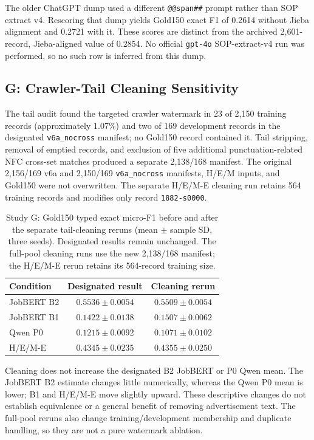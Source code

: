 The older ChatGPT dump used a different \texttt{@@span\#\#} prompt rather than SOP extract v4. Rescoring that dump yields Gold150 exact F1 of 0.2614 without Jieba alignment and 0.2721 with it. These scores are distinct from the archived 2,601-record, Jieba-aligned value of 0.2854. No official \texttt{gpt-4o} SOP-extract-v4 run was performed, so no such row is inferred from this dump.

\FloatBarrier
\subsection{G: Crawler-Tail Cleaning Sensitivity}
\label{sec:peel-sensitivity}

The tail audit found the targeted crawler watermark in 23 of 2,150 training records (approximately 1.07\%) and two of 169 development records in the designated \texttt{v6a\_nocross} manifest; no Gold150 record contained it. Tail stripping, removal of emptied records, and exclusion of five additional punctuation-related NFC cross-set matches produced a separate 2,138/168 manifest. The original 2,156/169 v6a and 2,150/169 \texttt{v6a\_nocross} manifests, H/E/M inputs, and Gold150 were not overwritten. The separate H/E/M-E cleaning run retains 564 training records and modifies only record \texttt{1882-s0000}.

\begin{table}[htbp]
\caption{Study G: Gold150 typed exact micro-F1 before and after the separate tail-cleaning reruns (mean $\pm$ sample SD, three seeds). Designated results remain unchanged. The full-pool cleaning runs use the new 2,138/168 manifest; the H/E/M-E rerun retains its 564-record training size.}
\label{tab:appendix-g-peel}
\centering
\small
\begin{tabularx}{\linewidth}{@{}Lcc@{}}
\toprule
Condition & Designated result & Cleaning rerun \\
\midrule
JobBERT B2 & $0.5536\pm0.0054$ & $0.5509\pm0.0054$ \\
JobBERT B1 & $0.1422\pm0.0138$ & $0.1507\pm0.0062$ \\
Qwen P0 & $0.1215\pm0.0092$ & $0.1071\pm0.0102$ \\
H/E/M-E & $0.4345\pm0.0235$ & $0.4355\pm0.0250$ \\
\bottomrule
\end{tabularx}
\end{table}

Cleaning does not increase the designated B2 JobBERT or P0 Qwen mean. The JobBERT B2 estimate changes little numerically, whereas the Qwen P0 mean is lower; B1 and H/E/M-E move slightly upward. These descriptive changes do not establish equivalence or a general benefit of removing advertisement text. The full-pool reruns also change training/development membership and duplicate handling, so they are not a pure watermark ablation.

